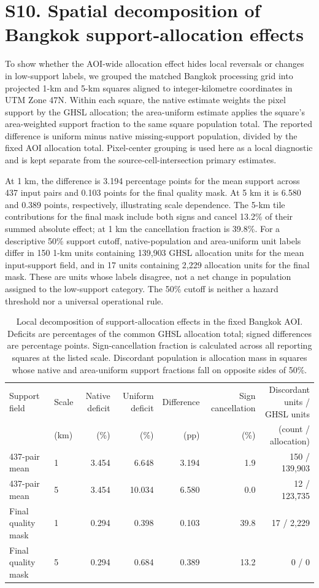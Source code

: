 \documentclass[10pt,a4paper]{article}
\begin{document}
\section*{S10. Spatial decomposition of Bangkok support-allocation effects}

To show whether the AOI-wide allocation effect hides local reversals or changes in low-support labels, we grouped the matched Bangkok processing grid into projected 1-km and 5-km squares aligned to integer-kilometre coordinates in UTM Zone 47N. Within each square, the native estimate weights the pixel support by the GHSL allocation; the area-uniform estimate applies the square's area-weighted support fraction to the same square population total. The reported difference is uniform minus native missing-support population, divided by the fixed AOI allocation total. Pixel-center grouping is used here as a local diagnostic and is kept separate from the source-cell-intersection primary estimates.

At 1 km, the difference is 3.194 percentage points for the mean support across 437 input pairs and 0.103 points for the final quality mask. At 5 km it is 6.580 and 0.389 points, respectively, illustrating scale dependence. The 5-km tile contributions for the final mask include both signs and cancel 13.2\% of their summed absolute effect; at 1 km the cancellation fraction is 39.8\%. For a descriptive 50\% support cutoff, native-population and area-uniform unit labels differ in 150 1-km units containing 139,903 GHSL allocation units for the mean input-support field, and in 17 units containing 2,229 allocation units for the final mask. These are units whose labels disagree, not a net change in population assigned to the low-support category. The 50\% cutoff is neither a hazard threshold nor a universal operational rule.

\begin{table}[htbp]\centering\scriptsize
\caption{Local decomposition of support-allocation effects in the fixed Bangkok AOI. Deficits are percentages of the common GHSL allocation total; signed differences are percentage points. Sign-cancellation fraction is calculated across all reporting squares at the listed scale. Discordant population is allocation mass in squares whose native and area-uniform support fractions fall on opposite sides of 50\%.}
\begin{tabular}{llrrrrr}\toprule
Support field & Scale & Native deficit & Uniform deficit & Difference & Sign cancellation & \shortstack{Discordant units /\\GHSL units}\\
 & (km) & (\%) & (\%) & (pp) & (\%) & (count / allocation)\\\midrule
437-pair mean & 1 & 3.454 & 6.648 & 3.194 & 1.9 & 150 / 139,903\\
437-pair mean & 5 & 3.454 & 10.034 & 6.580 & 0.0 & 12 / 123,735\\
Final quality mask & 1 & 0.294 & 0.398 & 0.103 & 39.8 & 17 / 2,229\\
Final quality mask & 5 & 0.294 & 0.684 & 0.389 & 13.2 & 0 / 0\\
\bottomrule\end{tabular}
\end{table}
\end{document}

